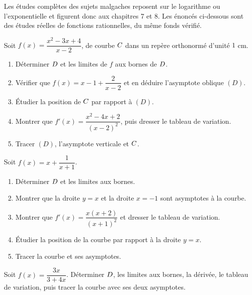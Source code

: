 \begin{annales}
Les études complètes des sujets malgaches reposent sur le logarithme ou
l'exponentielle et figurent donc aux chapitres 7 et 8. Les énoncés ci-dessous
sont des études réelles de fonctions rationnelles, du même fonds vérifié.

Soit $f(x) = \dfrac{x^{2}-3x+4}{x-2}$, de courbe $C$ dans un repère
orthonormé d'unité $1$ cm.
\begin{enumerate}[label=\textbf{\alph*)}, leftmargin=*, itemsep=0.15em]
  \item Déterminer $D$ et les limites de $f$ aux bornes de $D$.
  \item Vérifier que $f(x) = x-1+\dfrac{2}{x-2}$ et en déduire l'asymptote
        oblique $(D)$.
  \item Étudier la position de $C$ par rapport à $(D)$.
  \item Montrer que $f'(x) = \dfrac{x^{2}-4x+2}{(x-2)^{2}}$, puis dresser le
        tableau de variation.
  \item Tracer $(D)$, l'asymptote verticale et $C$.
\end{enumerate}

Soit $f(x) = x+\dfrac{1}{x+1}$.
\begin{enumerate}[label=\textbf{\alph*)}, leftmargin=*, itemsep=0.15em]
  \item Déterminer $D$ et les limites aux bornes.
  \item Montrer que la droite $y = x$ et la droite $x = -1$ sont asymptotes
        à la courbe.
  \item Montrer que $f'(x) = \dfrac{x(x+2)}{(x+1)^{2}}$ et dresser le
        tableau de variation.
  \item Étudier la position de la courbe par rapport à la droite $y = x$.
  \item Tracer la courbe et ses asymptotes.
\end{enumerate}

Soit $f(x) = \dfrac{3x}{3+4x}$. Déterminer $D$, les limites aux bornes, la
dérivée, le tableau de variation, puis tracer la courbe avec ses deux
asymptotes.
\end{annales}

